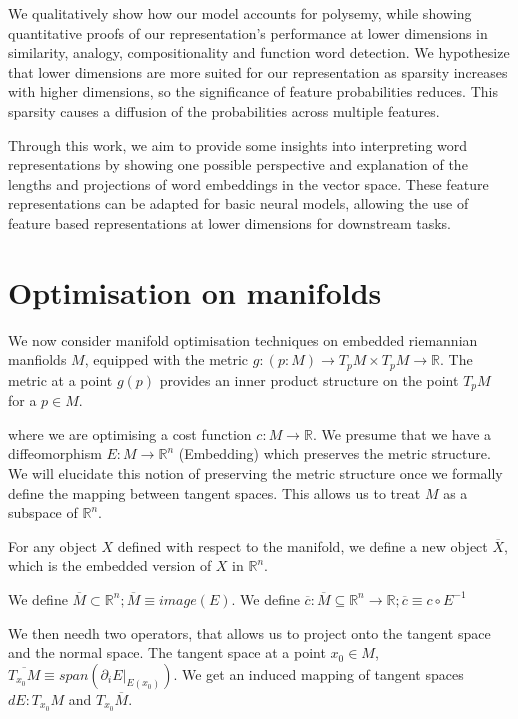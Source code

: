\documentclass[11pt]{book}
\begin{document}
We qualitatively show how our model accounts for polysemy, while showing
quantitative proofs of our representation's performance at lower dimensions in
similarity, analogy, compositionality and function word detection. We
hypothesize that lower dimensions are more suited for our representation as
sparsity increases with higher dimensions, so the significance of feature
probabilities reduces. This sparsity causes a diffusion of the probabilities
across multiple features. 

Through this work, we aim to provide some insights into interpreting word
representations by showing one possible perspective and explanation of the
lengths and projections of word embeddings in the vector space. These feature
representations can be adapted for basic neural models, allowing the use of
feature based representations at lower dimensions for downstream tasks.

\chapter{Optimisation on manifolds}
We now consider manifold optimisation techniques on embedded riemannian manfiolds $M$,
equipped with the metric $g: (p: M) \rightarrow T_p M  \times T_p M \rightarrow \mathbb R$.
The metric at a point $g(p)$ provides an inner product structure on the point $T_pM$
for a $p \in M$.

where we are optimising a cost function $c: M \rightarrow \mathbb R$.
We presume that we have a diffeomorphism $E: M \rightarrow \mathbb R^n$ (Embedding) which
preserves the metric structure. We will elucidate this notion of preserving
the metric structure once we formally define the mapping between tangent spaces.
This allows us to treat $M$ as a subspace of $\mathbb R^n$.

For any object $X$
defined with respect to the manifold, we define a new object $\overline X$, which
is the embedded version of $X$ in $\mathbb R^n$.

We define $\overline M \subset \mathbb R^n; \overline M \equiv image(E)$.
We define $\overline c: \overline M \subseteq \mathbb R^n \rightarrow \mathbb R; \overline c \equiv c \circ E^{-1}$

We then needh two operators, that allows us to project onto the tangent space
and the normal space. The tangent space at a point $x_0 \in M$, $\overline{T_{x_0} M} \equiv span(\partial_i E |_{E(x_0)})$. 
We get an induced mapping of tangent spaces $dE: T_{x_0} M$ and $T_{x_0} \overline M$.
\end{document}
